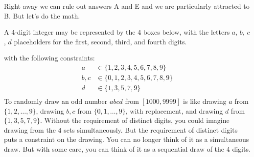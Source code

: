 \documentclass[12pt]{article}
\begin{document}
Right away we can rule out answers A and E and we are particularly attracted to B. But let's do the math.

A $4$-digit integer may be represented by the $4$ boxes below, with the letters $a$, $b$, $c$, $d$ placeholders for the first, second, third, and fourth digits.

\begin{center}
\end{center}
with the following constraints:
\begin{align*}
a & \in \{1,2,3,4,5,6,7,8,9\} \\
b,c & \in \{0,1,2,3,4,5,6,7,8,9\} \\
d & \in \{1,3,5,7,9\} \\
\end{align*}
To randomly draw an odd number $abcd$ from $[1000,9999]$ is like drawing $a$ from $\{1,2,\ldots,9\}$, drawing $b,c$ from $\{0,1,\ldots,9\}$, with replacement, and drawing $d$ from $\{1,3,5,7,9\}$. Without the requirement of distinct digits, you could imagine drawing from the $4$ sets simultaneously. But the requirement of distinct digits puts a constraint on the drawing. You can no longer think of it as a simultaneous draw. But with some care, you can think of it as a sequential draw of the $4$ digits. 
\end{document}
